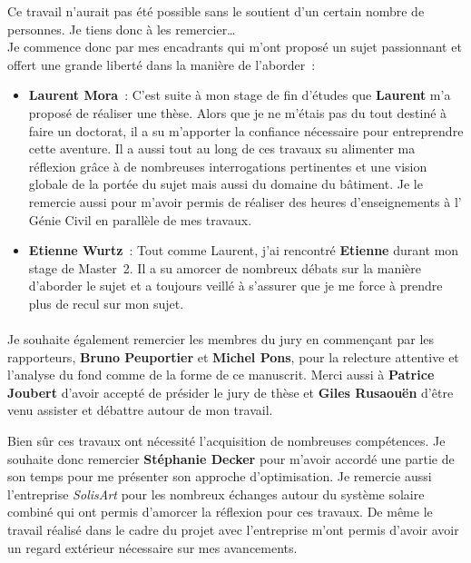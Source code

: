 
Ce travail n’aurait pas été possible sans le soutient d’un certain nombre de personnes.
Je tiens donc à les remercier\dots\\

Je commence donc par mes encadrants qui m’ont proposé un sujet passionnant et
offert une grande liberté dans la manière de l’aborder~:
\begin{itemize}
  \item \textbf{Laurent Mora}~: C’est suite à mon stage de fin d’études que \textbf{Laurent} m’a proposé
        de réaliser une thèse. Alors que je ne m’étais pas du tout destiné à faire
        un doctorat, il a su m’apporter la confiance nécessaire pour entreprendre
        cette aventure.
        Il a aussi tout au long de ces travaux su alimenter ma réflexion grâce à de
        nombreuses interrogations pertinentes et une vision globale de la portée
        du sujet mais aussi du domaine du bâtiment.
        Je le remercie aussi pour m’avoir permis de réaliser des heures d’enseignements
        à l’ Génie Civil en parallèle de mes travaux.

  \item \textbf{Etienne Wurtz}~: Tout comme Laurent, j’ai rencontré \textbf{Etienne} durant mon stage
        de Master~2. Il a su amorcer de nombreux débats sur la manière d’aborder
        le sujet et a toujours veillé à s’assurer que je me force à prendre plus de
        recul sur mon sujet.
\end{itemize}

\paragraph{} %
Je souhaite également remercier les membres du jury en commençant par les rapporteurs,
\textbf{Bruno Peuportier} et \textbf{Michel Pons}, pour la relecture attentive et l’analyse du fond comme
de la forme de ce manuscrit. Merci aussi à \textbf{Patrice Joubert} d’avoir accepté de présider
le jury de thèse et \textbf{Giles Rusaouën} d’être venu assister et débattre autour de mon travail.

Bien sûr ces travaux ont nécessité l’acquisition de nombreuses compétences. Je souhaite donc
remercier \textbf{Stéphanie Decker} pour m’avoir accordé une partie de son temps pour me présenter son
approche d’optimisation.
Je remercie aussi l’entreprise \emph{SolisArt} pour les nombreux échanges
autour du système solaire combiné qui ont permis d’amorcer la réflexion pour ces travaux.
De même le travail réalisé dans le cadre du projet  avec l’entreprise  m’ont
permis d’avoir avoir un regard extérieur nécessaire sur mes avancements.

